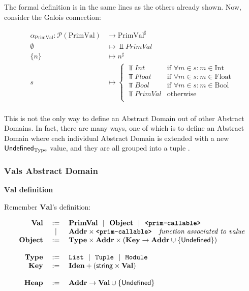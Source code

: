 The formal definition is in the same lines as the others already shown. Now, consider the
Galois connection:

\[\begin{array}{rl}
  \alpha_{\text{PrimVal}} \colon \mathcal{P}(\text{PrimVal}) &\to \text{PrimVal}^\sharp \\
  \emptyset &\mapsto \Bot{PrimVal} \\
  \{n\} &\mapsto n^\sharp \\
  s &\mapsto \left\{
  \begin{array}{ll}
    \Top{Int} & \text{if } \forall m \in s: m \in \text{Int} \\
    \Top{Float} & \text{if } \forall m \in s: m \in \text{Float} \\
    \Top{Bool} & \text{if } \forall m \in s: m \in \text{Bool} \\
    \Top{PrimVal} & \text{otherwise} \\
  \end{array} \right. \\
\end{array}\]

This is not the only way to define an Abstract Domain out of other Abstract Domains. In
fact, there are many ways, one of which is to define an Abstract Domain where each
individual Abstract Domain is extended with a new \(\mathsf{Undefined}_{\text{Type}}\) value, and
they are all grouped into a tuple \autocite{fromherz_static_2018}.


\subsubsection*{\texorpdfstring{\(\mathbf{Val}\)s Abstract
Domain}{Vals Abstract Domain}}\label{vals-abstract-domain}

\noindent \textbf{\(\mathbf{Val}\) definition}

Remember \(\mathbf{Val}\)'s definition:

\vspace*{-1em}
$$\begin{array}{rcl}
  \mathbf{Val} &:=& \mathbf{PrimVal} ~~|~~ \mathbf{Object} ~~|~~ \textbf{\texttt{<prim-callable>}} \\
         &~~|~~& \mathbf{Addr} \times \textbf{\texttt{<prim-callable>}} \quad \textit{function associated to value} \\
  \mathbf{Object} &:=& \mathbf{Type} \times \mathbf{Addr} \times \left(\mathbf{Key} \to \mathbf{Addr} \cup \{\mathsf{Undefined}\}\right) \\
  \\
  \mathbf{Type} &:=& \texttt{List} ~~|~~ \texttt{Tuple} ~~|~~ \texttt{Module} \\
  \mathbf{Key} &:=& \mathbf{Iden} + \left(\textsf{string} \times \mathbf{Val}\right) \\
  \\
  \mathbf{Heap}  &:=& \mathbf{Addr} \to \mathbf{Val} \cup \{\mathsf{Undefined}\} \\
\end{array}$$

